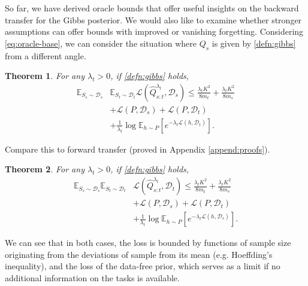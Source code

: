 \documentclass{article}
\theoremstyle{plain}
\newtheorem{theorem}{Theorem}[section]
\theoremstyle{definition}
\theoremstyle{remark}
\begin{document}
So far, we have derived oracle bounds that offer useful insights on the backward transfer for the Gibbs posterior. We would also like to examine whether stronger assumptions can offer bounds with improved or vanishing forgetting.
Considering \eqref{eq:oracle-base}, we can consider the situation where $Q_s$ is given by \eqref{defn:gibbs} from a different angle.

\begin{theorem}
For any $\lambda_t>0$, if \eqref{defn:gibbs} holds, 
%
\begin{equation} 
\begin{split}
\mathbb{E}_{S_s\sim \mathcal{D}_s}&\mathbb{E}_{S_t\sim \mathcal{D}_t}\mathcal{L}( \hat{Q}^{\lambda_t}_{s:t},\mathcal{D}_s)\leq \frac{\lambda_t K^2}{8m_t}+\frac{\lambda_t K^2}{8m_s}\\&+\mathcal{L}(P,\mathcal{D}_s)+\mathcal{L}(P,\mathcal{D}_t) \\&+\frac{1}{\lambda_t}\log\mathbb{E}_{h\sim P}\left [e^{-\lambda_t\mathcal{L}(h,\mathcal{D}_t)} \right ] .
\end{split}
\end{equation}
\end{theorem}

Compare this to forward transfer (proved in Appendix \ref{append:proofs}).
\begin{theorem}
For any $\lambda_t>0$, if \eqref{defn:gibbs} holds, 
%
\begin{equation} 
\begin{split}
\mathbb{E}_{S_s\sim \mathcal{D}_s}\mathbb{E}_{S_t\sim \mathcal{D}_t}&\mathcal{L}( \hat{Q}^{\lambda_t}_{s:t},\mathcal{D}_t)\leq \frac{\lambda_t K^2}{8m_t}+\frac{\lambda_t K^2}{8m_s}\\&+\mathcal{L}(P,\mathcal{D}_s)+\mathcal{L}(P,\mathcal{D}_t) \\&+\frac{1}{\lambda_t}\log\mathbb{E}_{h\sim P}\left [e^{-\lambda_t\mathcal{L}(h,\mathcal{D}_s)} \right ] .
\end{split}
\end{equation}
\end{theorem}

We can see that in both cases, the loss is bounded by functions of sample size originating from the deviations of sample from its mean (e.g. Hoeffding's inequality), and the loss of the data-free prior, which serves as a limit if no additional information on the tasks is available.
\end{document}
